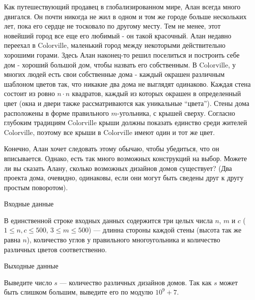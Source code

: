 Как путешествующий продавец в глобализированном мире, Алан всегда много двигался. Он почти никогда
не жил в одном и том же городе больше нескольких лет, пока его сердце не тосковало по другому месту.
Тем не менее, этот новейший город все еще его любимый - он такой красочный. Алан недавно переехал
в Colorville, маленький город между некоторыми действительно хорошими горами. Здесь Алан наконец-то
решил поселиться и построить себе дом - хороший большой дом, чтобы назвать его собственным.
В Colorville, у многих людей есть свои собственные дома - каждый окрашен различным шаблоном цветов
так, что никакие два дома не выглядят одинаково. Каждая стена состоит из ровно $n \cdot n$ квадратов,
каждый из которых окрашен в определенный цвет (окна и двери также рассматриваются как уникальные
``цвета''). Стены дома расположены в форме правильного $m$-угольника, с крышей сверху. Согласно
глубоким традициям Colorville крыши должны показать единство среди жителей Colorville, поэтому все
крыши в Colorville имеют один и тот же цвет.

Конечно, Алан хочет следовать этому обычаю, чтобы убедиться, что он вписывается. Однако, есть
так много возможных конструкций на выбор. Можете ли вы сказать Алану, сколько возможных дизайнов
домов существует? (Два проекта дома, очевидно, одинаковы, если они могут быть сведены друг к другу
простым поворотом).

Входные данные

В единственной строке входных данных содержится три целых числа $n$, $m$ и $c$ ($1 \le n, c \le 500$,
$3 \le m \le 500$) --- длинна стороны каждой стены (высота так же равна $n$), количество углов у
правильного многоугольника и количество различных цветов соответственно.

Выходные данные

Выведите число $s$ --- количество различных дизайнов домов. Так как $s$ может быть слишком большим,
выведите его по модулю $10^9 + 7$.
